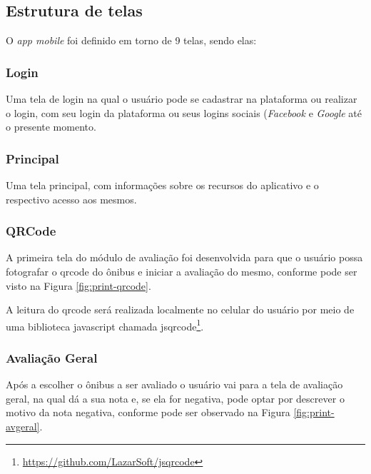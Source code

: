 \subsection{Estrutura de telas}
O \textit{app mobile} foi definido em torno de 9 telas, sendo elas:

\subsubsection{Login}
Uma tela de login na qual o usuário pode se cadastrar na plataforma ou realizar o login, com seu login da plataforma ou seus logins sociais (\textit{Facebook} e \textit{Google} até o presente momento.
    
\subsubsection{Principal}
Uma tela principal, com informações sobre os recursos do aplicativo e o respectivo acesso aos mesmos.
    
\subsubsection{QRCode}
A primeira tela do módulo de avaliação foi desenvolvida para que o usuário possa fotografar o \gls{qrcode} do ônibus e iniciar a avaliação do mesmo, conforme pode ser visto na Figura \ref{fig:print-qrcode}.
    
A leitura do \gls{qrcode} será realizada localmente no celular do usuário por meio de uma biblioteca javascript chamada jsqrcode\footnote{\url{https://github.com/LazarSoft/jsqrcode}}.

\subsubsection{Avaliação Geral}
Após a escolher o ônibus a ser avaliado o usuário vai para a tela de avaliação geral, na qual dá a sua nota e, se ela for negativa, pode optar por descrever o motivo da nota negativa, conforme pode ser observado na Figura \ref{fig:print-avgeral}.
    
